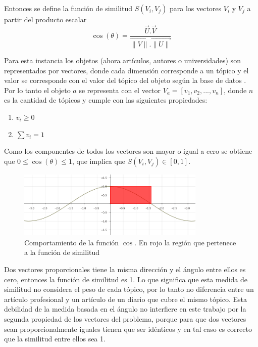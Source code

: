 Entonces se define la función de similitud $S(V_i, V_j)$ para los vectores $V_i$ y $V_j$ a partir del producto escalar\\

\begin{equation} \label{eq:angulovectorial}
\cos(\theta) =  \dfrac{\overrightarrow{U} . \overrightarrow{V}}{\overrightarrow{\lVert V\lVert}.\overrightarrow{\lVert U\lVert}}
\end{equation}

Para esta instancia los objetos (ahora artículos, autores o universidades) son representados por vectores, donde cada dimensión corresponde a un tópico y el valor se corresponde con el valor del tópico del objeto según la base de datos \cite{dataDrive}. Por lo tanto el objeto $a$ se representa con el vector $V_a = [v_1,v_2,...,v_n]$, donde $n$ es la cantidad de tópicos y cumple con las siguientes propiedades:
\begin{enumerate}
 \item $v_i \geq 0$
 \item $\sum{v_i} = 1$
\end{enumerate}

Como los componentes de todos los vectores son mayor o igual a cero se obtiene que $0\leq\cos(\theta)\leq1$, que implica que $S(V_i, V_j) \in \left[0, 1\right]$.

\begin{figure}[H]
\includegraphics[width=0.8\textwidth]{img/coseno.png}
\caption{Comportamiento de la función $\cos$. En rojo la región que pertenece a la función de similitud}
\label{bus:img-coseno}
\end{figure}

Dos vectores proporcionales tiene la misma dirección y el ángulo entre ellos es cero, entonces la función de similitud es 1. Lo que significa que esta medida de similitud no considera el peso de cada tópico, por lo tanto no diferencia entre un artículo profesional y un artículo de un diario que cubre el mismo tópico. Esta debilidad de la medida basada en el ángulo no interfiere en este trabajo por la segunda propiedad de los vectores del problema, porque para que dos vectores sean proporcionalmente iguales tienen que ser idénticos y en tal caso es correcto que la similitud entre ellos sea 1.

